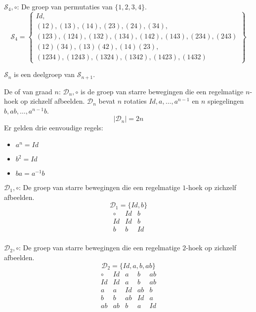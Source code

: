 \documentclass[main.tex]{subfiles}
\begin{document}
\begin{vb}
  $\mathcal{S}_{4},\circ$: De groep van permutaties van $\{ 1,2,3,4 \}$.
  \[
  \mathcal{S}_{4} =
  \left\{
  \begin{array}{l}
     Id,\\
     (12), (13), (14), (23), (24), (34),\\
     (123), (124), (132), (134), (142), (143), (234), (243)\\
     (12)(34), (13)(42), (14)(23),\\
     (1234), (1243), (1324), (1342), (1423), (1432)
  \end{array}
  \right\}
  \]
\commn \cycln
\end{vb}

\begin{ei}
  $\mathcal{S}_{n}$ is een deelgroep van $\mathcal{S}_{n+1}$.
\end{ei}


\begin{de}
  De  of  van graad $n$: $\mathcal{D}_{n},\circ$ is de groep van starre bewegingen die een regelmatige $n$-hoek op zichzelf afbeelden.
  $\mathcal{D}_{n}$ bevat $n$ rotaties $Id, a, \dotsc, a^{n-1}$ en $n$ spiegelingen $b,ab,\dotsc,a^{n-1}b$.
  \[ |\mathcal{D}_{n}| = 2n \]
  Er gelden drie eenvoudige regels:
  \begin{itemize}
  \item $a^{n} = Id$
  \item $b^{2} = Id$
  \item $ba = a^{-1}b$
  \end{itemize}
\commn \cycln
\end{de}

\begin{vb}
  $\mathcal{D}_{1},\circ$: De groep van starre bewegingen die een regelmatige $1$-hoek op zichzelf afbeelden.
  \[ \mathcal{D}_{1} = \{ Id, b \} \]
  \[
  \begin{array}{c|cccccc}
    \circ & Id & b\\
    \hline
    Id & Id & b\\
    b & b & Id\\
  \end{array}
  \]
\commj {}
\end{vb}

\begin{vb}
  $\mathcal{D}_{2},\circ$: De groep van starre bewegingen die een regelmatige $2$-hoek op zichzelf afbeelden.
  \[ \mathcal{D}_{2} = \{ Id, a, b, ab \} \]
  \[
  \begin{array}{c|cccccc}
    \circ & Id & a & b & ab\\
    \hline
    Id & Id & a & b & ab\\
    a & a & Id & ab & b\\
    b & b & ab & Id & a\\
    ab & ab & b & a & Id
  \end{array}
  \]
\commj \cycln
\end{vb}
\end{document}
